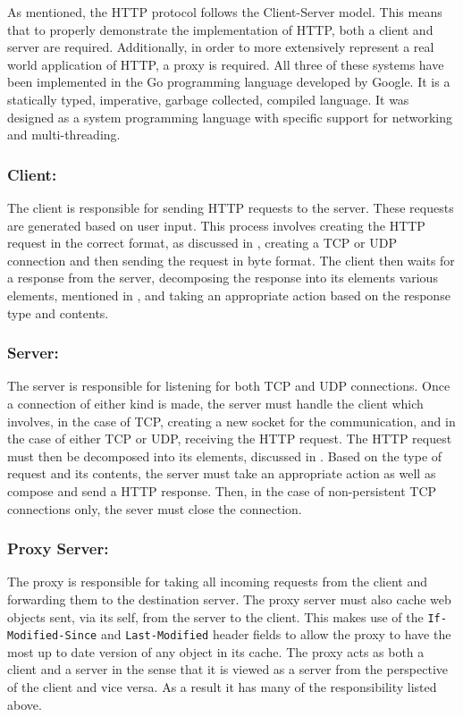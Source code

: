 \documentclass[10pt,twocolumn]{witseiepaper}
\begin{document}
	As mentioned, the HTTP protocol follows the Client-Server model. This means that to properly demonstrate the implementation of HTTP, both a client and server are required. Additionally, in order to more extensively represent a real world application of HTTP, a proxy is required. All three of these systems have been implemented in the Go programming language developed by Google. It is a statically typed, imperative, garbage collected, compiled language. It was designed as a system programming language with specific support for networking and multi-threading.

	\subsubsection{Client:}

	The client is responsible for sending HTTP requests to the server. These requests are generated based on user input. This process involves creating the HTTP request in the correct format, as discussed in , creating a TCP or UDP connection and then sending the request in byte format. The client then waits for a response from the server, decomposing the response into its elements various elements, mentioned in , and taking an appropriate action based on the response type and contents.

	\subsubsection{Server:}

	The server is responsible for listening for both TCP and UDP connections. Once a connection of either kind is made, the server must handle the client which involves, in the case of TCP, creating a new socket for the communication, and in the case of either TCP or UDP, receiving the HTTP request. The HTTP request must then be decomposed into its elements, discussed in . Based on the type of request and its contents, the server must take an appropriate action as well as compose and send a HTTP response. Then, in the case of non-persistent TCP connections only, the sever must close the connection.

	\subsubsection{Proxy Server:}

	The proxy is responsible for taking all incoming requests from the client and forwarding them to the destination server. The proxy server must also cache web objects sent, via its self, from the server to the client. This makes use of the \texttt{If-Modified-Since} and \texttt{Last-Modified} header fields to allow the proxy to have the most up to date version of any object in its cache. The proxy acts as both a client and a server in the sense that it is viewed as a server from the perspective of the client and vice versa. As a result it has many of the responsibility listed above.
\end{document}
